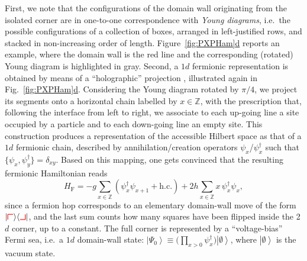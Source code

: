 \documentclass[reprint,aps,prl,superscriptaddress,english,nolongbibliography]{revtex4-2}
\newcommand{\sbra}[1]{\langle #1 |}
\newcommand{\sket}[1]{| #1 \rangle}
\newcommand{\ket}[1]{\left| #1 \right\rangle}
\newcommand{\ulmove}[0]{%
\begin{tikzpicture}[baseline=0.1ex]%
\draw[thick, red] (0,1.5ex) -- (1.5ex,1.5ex);%
\draw[thick, red] (0,1.5ex) -- (0,0);%
\end{tikzpicture}%
}
\newcommand{\drmove}[0]{%
\begin{tikzpicture}[baseline=0.1ex]%
\draw[thick, red] (0,0) -- (1.5ex,0);%
\draw[thick, red] (1.5ex,1.5ex) -- (1.5ex,0ex);%
\end{tikzpicture}%
}
\begin{document}
First, we note that the configurations of the domain wall originating from the isolated corner are in one-to-one correspondence with \emph{Young diagrams}, i.e.\ the possible configurations of a collection of boxes, arranged in left-justified rows, and stacked in non-increasing order of length. Figure~\hyperref[fig:PXPHam]{\ref{fig:PXPHam}d} reports an example, where the domain wall is the red line and the corresponding (rotated) Young diagram is highlighted in gray. Second, a $1d$ fermionic representation is obtained by means of a ``holographic'' projection \cite{Okounkov2001Infinite,Okounkov2006Quantum,Dijkgraaf2009Quantum,araujo2021quantum,Krapivsky2004Dynamics,Krapivsky2012Limiting,Krapivsky2021Stochastic}, illustrated again in Fig.~\hyperref[fig:PXPHam]{\ref{fig:PXPHam}d}. Considering the Young diagram rotated by $\pi/4$, we project its segments onto a horizontal chain labelled by $x\in\mathbb{Z}$, with the prescription that, following the interface from left to right, we associate to each up-going line a site occupied by a particle and to each down-going line an empty site. This construction produces a representation of the accessible Hilbert space as that of a $1d$ fermionic chain, described by annihilation/creation operators $\psi_x$/$\psi_x^{\dagger}$ such that $\{\psi_x, \psi^{\dagger}_y \} = \delta_{xy}$. Based on this mapping, one gets convinced that the resulting fermionic Hamiltonian reads~\cite{SupplMat}
\begin{equation}
    \label{eq:hamFerm}
    H_{\mathrm{F}} = - g\sum_{x\in\mathbb{Z}} \left( \psi_x^{\dagger} \psi_{x+1} + \mathrm{h.c.} \right) + 2 h \sum_{x\in\mathbb{Z}} x \, \psi_x^{\dagger} \psi_x^{\phantom{\dagger}},
\end{equation} 
since a fermion hop corresponds to an elementary domain-wall move of the form $\sket{\ulmove}{}\sbra{\drmove}$, and the last sum counts how many squares have been flipped inside the 2$d$ corner, up to a constant. The full corner is represented by a ``voltage-bias'' Fermi sea, i.e.\ a $1d$ domain-wall state: $\ket{\Psi_0} \equiv \big(\prod_{x>0}\psi_x^{\dagger}\big) \ket{\emptyset}$, where $\ket{\emptyset}$ is the vacuum state. 
\end{document}
